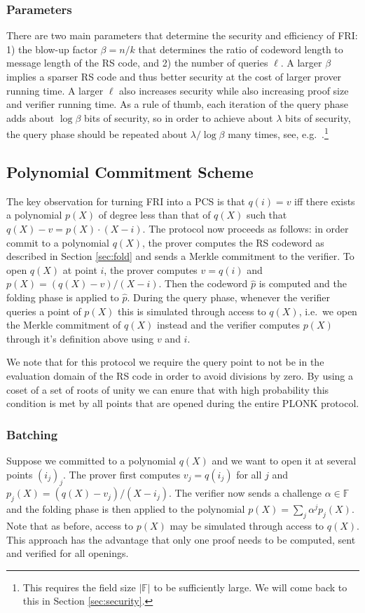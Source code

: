 \documentclass[final]{zamarep}
\newcommand{\field}{\mathbb{F}}
\begin{document}
\subsubsection{Parameters}
\label{sec:fri_params}
There are two main parameters that determine the security and efficiency of FRI: 1) the blow-up factor $\beta = n/k$ that determines the ratio of codeword length to message length of the RS code, and 2) the number of queries $\ell$. A larger $\beta$ implies a sparser RS code and thus better security at the cost of larger prover running time. A larger $\ell$ also increases security while also increasing proof size and verifier running time. As a rule of thumb, each iteration of the query phase adds about $\log \beta$ bits of security, so in order to achieve about $\lambda$ bits of security, the query phase should be repeated about $\lambda / \log \beta$ many times, see, e.g.\ \cite{FOCS:BCIKS20,EPRINT:StarkWare21,cryptoeprint:2023/474}.\footnote{This requires the field size $\lvert \field \rvert$ to be sufficiently large. We will come back to this in Section \ref{sec:security}.}

\subsection{Polynomial Commitment Scheme}
\label{sec:pcs}
The key observation for turning FRI into a PCS is that $q(i) = v$ iff there exists a polynomial $p(X)$ of degree less than that of $q(X)$ such that $q(X) - v = p(X) \cdot (X - i)$. The protocol now proceeds as follows: in order commit to a polynomial $q(X)$, the prover computes the RS codeword as described in Section \ref{sec:fold} and sends a Merkle commitment to the verifier. To open $q(X)$ at point $i$, the prover computes $v=q(i)$ and $p(X) = (q(X) - v)/(X - i)$. Then the codeword $\hat p$ is computed and the folding phase is applied to $\hat p$. During the query phase, whenever the verifier queries a point of $p(X)$ this is simulated through access to $q(X)$, i.e.\ we open the Merkle commitment of $q(X)$ instead and the verifier computes $p(X)$ through it's definition above using $v$ and $i$.

We note that for this protocol we require the query point to not be in the evaluation domain of the RS code in order to avoid divisions by zero. By using a coset of a set of roots of unity we can enure that with high probability this condition is met by all points that are opened during the entire PLONK protocol.

\subsubsection{Batching}
\label{fri_batch}
Suppose we committed to a polynomial $q(X)$ and we want to open it at several points $(i_j)_j$. The prover first computes $v_j = q(i_j)$ for all $j$ and $p_j(X) = (q(X) - v_j)/(X - i_j)$. The verifier now sends a challenge $\alpha \in \field$ and the folding phase is then applied to the polynomial $p(X) = \sum_j \alpha^j p_j(X)$. Note that as before, access to $p(X)$ may be simulated through access to $q(X)$. This approach has the advantage that only one proof needs to be computed, sent and verified for all openings.
\end{document}
